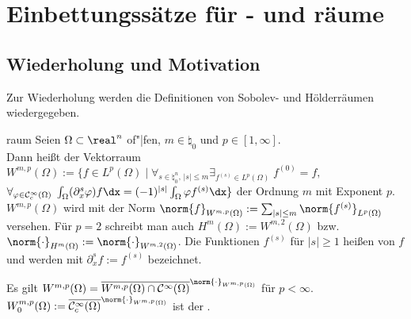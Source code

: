 
\section{%
    Einbettungssätze für - und räume%
}

\subsection{%
    Wiederholung und Motivation%
}

\begin{Bem}
    Zur Wiederholung werden die Definitionen von Sobolev- und Hölderräumen wiedergegeben.
\end{Bem}

\begin{Def}{raum}
    Seien $\Omega \subset \real^n$ of"|fen, $m \in \natural_0$ und $p \in [1, \infty]$.\\
    Dann heißt der Vektorraum
    $W^{m,p}(\Omega) := \{f \in L^p(\Omega) \;|\; \forall_{s \in \natural_0^n,\, |s| \le m}
    \exists_{f^{(s)} \in L^p(\Omega)}\; f^{(0)} = f,$\\
    $\forall_{\varphi \in \C^\infty_c(\Omega)}\;
    \int_\Omega (\partial_x^s \varphi) f \dx = (-1)^{|s|} \int_\Omega \varphi f^{(s)} \dx\}$
     der Ordnung $m$ mit Exponent $p$.\\
    $W^{m,p}(\Omega)$ wird mit der Norm
    $\norm{f}_{W^{m,p}(\Omega)} := \sum_{|s| \le m} \norm{f^{(s)}}_{L^p(\Omega)}$ versehen.
    Für $p = 2$ schreibt man auch $H^m(\Omega) := W^{m,2}(\Omega)$ bzw.
    $\norm{\cdot}_{H^m(\Omega)} := \norm{\cdot}_{W^{m,2}(\Omega)}$.
    Die Funktionen $f^{(s)}$ für $|s| \ge 1$ heißen  von $f$
    und werden mit $\partial_x^s f := f^{(s)}$ bezeichnet.
\end{Def}

\begin{Bem}
    Es gilt $W^{m,p}(\Omega) =
    \overline{W^{m,p}(\Omega) \cap \C^\infty(\Omega)}^{\norm{\cdot}_{W^{m,p}(\Omega)}}$
    für $p < \infty$.\\
    $W^{m,p}_0(\Omega) := \overline{\C^\infty_c(\Omega)}^{\norm{\cdot}_{W^{m,p}(\Omega)}}$
    ist der .
\end{Bem}

